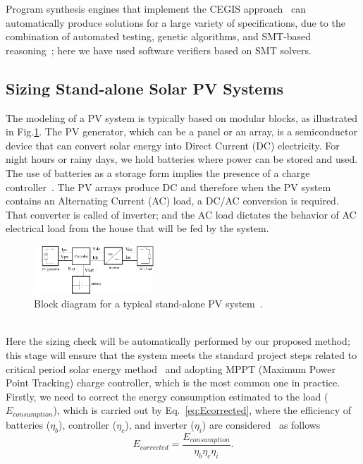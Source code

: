 \documentclass[10pt,conference]{IEEEtran}
\begin{document}
Program synthesis engines that implement the CEGIS approach~\cite{sketch} can automatically produce solutions for a large variety of specifications, due to the combination of automated testing, genetic algorithms, and SMT-based reasoning~\cite{Sharma14}; here we have used software verifiers based on SMT solvers.%
%
\subsection{Sizing Stand-alone Solar PV Systems}
\label{sec:sizing}

The modeling of a PV system is typically based on modular blocks, as illustrated in Fig.\ref{fig:blockdiagram}. %
The PV generator, which can be a panel or an array, is a semiconductor device that can convert solar energy into Direct Current (DC) electricity. %
For night hours or rainy days, we hold batteries where power can be stored and used. The use of batteries as a storage form implies the presence of a charge controller~\cite{Hansen}. The PV arrays produce DC and therefore when the PV system contains an Alternating Current (AC) load, a DC/AC conversion is required. That converter is called of inverter; and the AC load dictates the behavior of AC electrical load from the house that will be fed by the system.
\begin{figure}[h]
\includegraphics[width=0.4\textwidth]{blockdiagramPVS2_rev}
\centering
\caption{Block diagram for a typical stand-alone PV system~\cite{Hansen}.}
\label{fig:blockdiagram} 
\end{figure}
\\
%
Here the sizing check will be automatically performed by our proposed method; this stage will ensure that the system meets the standard project steps related to critical period solar energy method~\cite{Pinho} and adopting MPPT (Maximum Power Point Tracking) charge controller, which is the most common one in practice. 
%
Firstly, we need to correct the energy consumption estimated to the load ($E_{consumption}$), which is carried out by Eq.~\eqref{eq:Ecorrected}, where the efficiency of batteries ($\eta_{b}$), controller ($\eta_{c}$), and inverter ($\eta_{i}$) are considered~\cite{Pinho} as follows
\begin{equation}
\label{eq:Ecorrected}
\scriptstyle E_{corrected} = \dfrac{\scriptstyle E_{consumption}}{ \scriptstyle \eta_{b} \eta_{c} \eta_{i} }.
\end{equation}
\end{document}
